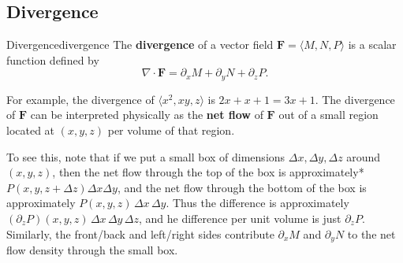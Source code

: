 \documentclass{watsonbook}
\begin{document}
\subsection{Divergence}


\begin{defn}{Divergence}{divergence}
  The \textbf{divergence} of a vector field $\mathbf{F} = \langle M, N, P \rangle$ is a scalar function defined by
\[
  \nabla \cdot \mathbf{F} = \partial_x M  +\partial _y N + \partial_z
  P. 
\]
\end{defn}

For example, the divergence of $\langle x^2, xy, z \rangle$ is
$2x + x + 1 = 3x + 1$. The divergence of $\mathbf{F}$ can be
interpreted physically as the \textbf{net flow} of $\mathbf{F}$ out of
a small region located at $(x,y,z)$ per volume of that region. 

To see this, note that if we put a small box of dimensions $\Delta x, \Delta y, \Delta z$
around $(x,y,z)$, then the net flow through the top of the box is
approximately* $P(x,y,z+\Delta z)\Delta x \Delta y$, and the net flow
through the bottom of the box is approximately
$P(x, y, z)\, \Delta x \,\Delta y$. Thus the difference is approximately
$(\partial_z P)(x,y,z) \, \Delta x \,  \Delta y \, \Delta z$, and he
difference per unit volume is just $\partial_z P$. Similarly, the front/back
and left/right sides contribute $\partial_x M$ and $\partial_y N$ to
the net flow density through the small box.
\end{document}
